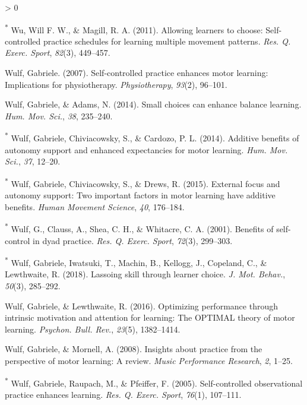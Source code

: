 \documentclass[
  english,
  man,floatsintext]{apa7}
\newlength{\cslhangindent}
\newenvironment{CSLReferences}[2] %
 {%
  \setlength{\parindent}{0pt}
  \ifodd #1 \everypar{\setlength{\hangindent}{\cslhangindent}}\ignorespaces\fi
  \ifnum #2 > 0
  \setlength{\parskip}{#2\baselineskip}
  \fi
 }%
 {}
\begin{document}
\begin{CSLReferences}{1}{0}
\leavevmode\hypertarget{ref-Wu2011-ha}{}%
\textsuperscript{*} Wu, Will F. W., \& Magill, R. A. (2011). Allowing learners to choose: Self-controlled practice schedules for learning multiple movement patterns. \emph{Res. Q. Exerc. Sport}, \emph{82}(3), 449--457.

\leavevmode\hypertarget{ref-Wulf2007-nc}{}%
Wulf, Gabriele. (2007). Self-controlled practice enhances motor learning: Implications for physiotherapy. \emph{Physiotherapy}, \emph{93}(2), 96--101.

\leavevmode\hypertarget{ref-Wulf2014-ti}{}%
Wulf, Gabriele, \& Adams, N. (2014). Small choices can enhance balance learning. \emph{Hum. Mov. Sci.}, \emph{38}, 235--240.

\leavevmode\hypertarget{ref-Wulf2014-sn}{}%
\textsuperscript{*} Wulf, Gabriele, Chiviacowsky, S., \& Cardozo, P. L. (2014). Additive benefits of autonomy support and enhanced expectancies for motor learning. \emph{Hum. Mov. Sci.}, \emph{37}, 12--20.

\leavevmode\hypertarget{ref-wulf2015-mg}{}%
\textsuperscript{*} Wulf, Gabriele, Chiviacowsky, S., \& Drews, R. (2015). External focus and autonomy support: Two important factors in motor learning have additive benefits. \emph{Human Movement Science}, \emph{40}, 176--184.

\leavevmode\hypertarget{ref-Wulf2001-nb}{}%
\textsuperscript{*} Wulf, G., Clauss, A., Shea, C. H., \& Whitacre, C. A. (2001). Benefits of self-control in dyad practice. \emph{Res. Q. Exerc. Sport}, \emph{72}(3), 299--303.

\leavevmode\hypertarget{ref-Wulf2018-ie}{}%
\textsuperscript{*} Wulf, Gabriele, Iwatsuki, T., Machin, B., Kellogg, J., Copeland, C., \& Lewthwaite, R. (2018). Lassoing skill through learner choice. \emph{J. Mot. Behav.}, \emph{50}(3), 285--292.

\leavevmode\hypertarget{ref-Wulf2016-gf}{}%
Wulf, Gabriele, \& Lewthwaite, R. (2016). Optimizing performance through intrinsic motivation and attention for learning: The {OPTIMAL} theory of motor learning. \emph{Psychon. Bull. Rev.}, \emph{23}(5), 1382--1414.

\leavevmode\hypertarget{ref-Wulf2008-de}{}%
Wulf, Gabriele, \& Mornell, A. (2008). Insights about practice from the perspective of motor learning: A review. \emph{Music Performance Research}, \emph{2}, 1--25.

\leavevmode\hypertarget{ref-Wulf2005-sz}{}%
\textsuperscript{*} Wulf, Gabriele, Raupach, M., \& Pfeiffer, F. (2005). Self-controlled observational practice enhances learning. \emph{Res. Q. Exerc. Sport}, \emph{76}(1), 107--111.


\end{CSLReferences}
\end{document}
